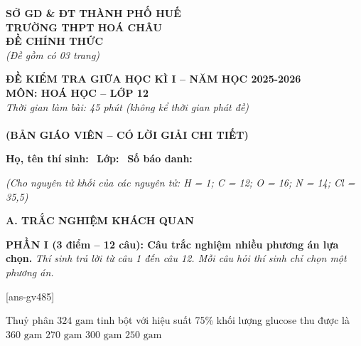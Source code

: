 \documentclass[12pt,a4paper]{article}
\begin{document}
\thispagestyle{firstpage}

\noindent
\begin{minipage}[t]{0.42\textwidth}
	\centering\fontsize{10pt}{12pt}\selectfont
	\textbf{SỞ GD \& ĐT THÀNH PHỐ HUẾ}\\
	\textbf{TRƯỜNG THPT HOÁ CHÂU}\\
	\textbf{ĐỀ CHÍNH THỨC}\\
	\textit{(Đề gồm có 03 trang)}
\end{minipage}\hfill
\begin{minipage}[t]{0.56\textwidth}
	\centering\small
	\textbf{ĐỀ KIỂM TRA GIỮA HỌC KÌ I – NĂM HỌC 2025-2026}\\
	\textbf{MÔN: HOÁ HỌC – LỚP 12}\\
	\textit{Thời gian làm bài: 45 phút (không kể thời gian phát đề)}\\
	\\
	\textbf{\color{hfRed}(BẢN GIÁO VIÊN -- CÓ LỜI GIẢI CHI TIẾT)}
\end{minipage}

\smallskip
\noindent\hrulefill
\smallskip

\noindent\textbf{Họ, tên thí sinh:} \dotfill\ \textbf{Lớp:} \dotfill\ \textbf{Số báo danh:} \dotfill

\smallskip
\noindent\textit{(Cho nguyên tử khối của các nguyên tử: H = 1; C = 12; O = 16; N = 14; Cl = 35,5)}
\smallskip

\noindent
\textbf{A. TRẮC NGHIỆM KHÁCH QUAN}

\smallskip
\noindent
\textbf{PHẦN I (3 điểm -- 12 câu): Câu trắc nghiệm nhiều phương án lựa chọn.} \textit{Thí sinh trả lời từ câu 1 đến câu 12. Mỗi câu hỏi thí sinh chỉ chọn một phương án.}

[ans-gv485]

\begin{ex}
Thuỷ phân $324\text{ gam}$ tinh bột với hiệu suất 75\% khối lượng glucose thu được là
\choice
{$360\text{ gam}$}
{\True $270\text{ gam}$}
{$300\text{ gam}$}
{$250\text{ gam}$}
\end{ex}
\end{document}
